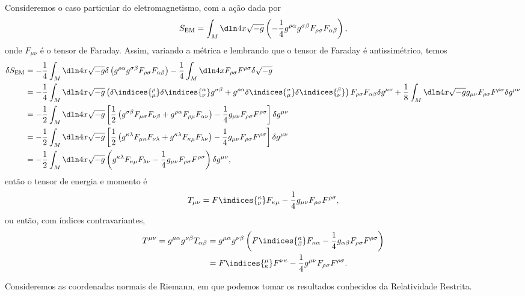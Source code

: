 Consideremos o caso particular do eletromagnetismo, com a ação dada por
\begin{equation*}
    S_\mathrm{EM} = \int_M\dln4x \sqrt{-g}\left(-\frac14 g^{\rho \alpha}g^{\sigma \beta}F_{\rho\sigma}F_{\alpha \beta}\right),
\end{equation*}
onde \(F_{\mu\nu}\) é o tensor de Faraday. Assim, variando a métrica e lembrando que o tensor de Faraday é antissimétrico, temos
\begin{align*}
    \delta S_\mathrm{EM} &= -\frac14\int_{M} \dln4x \sqrt{-g}\delta\left(g^{\rho \alpha}g^{\sigma \beta}F_{\rho\sigma}F_{\alpha\beta}\right) - \frac14 \int_{M} \dln4x F_{\rho\sigma}F^{\rho\sigma} \delta \sqrt{-g}\\
                         &= - \frac14 \int_{M} \dln4x \sqrt{-g} \left(\delta\indices{^\rho_\mu}\delta\indices{^\alpha_\nu} g^{\sigma\beta} + g^{\rho\alpha}\delta\indices{^\sigma_\mu}\delta\indices{^\beta_\nu}\right)F_{\rho\sigma}F_{\alpha\beta}\delta g^{\mu\nu} + \frac18\int_{M} \dln4x \sqrt{-g}g_{\mu\nu}F_{\rho\sigma}F^{\rho\sigma}\delta g^{\mu\nu}\\
                         &= - \frac12 \int_{M} \dln4x \sqrt{-g} \left[\frac12 \left(g^{\sigma\beta}F_{\mu\sigma}F_{\nu\beta} + g^{\rho\alpha}F_{\rho\mu}F_{\alpha\nu}\right) - \frac14 g_{\mu\nu}F_{\rho\sigma}F^{\rho\sigma}\right]\delta g^{\mu\nu}\\
                         &= - \frac12 \int_{M} \dln4x \sqrt{-g} \left[\frac12 \left( g^{\kappa\lambda}F_{\mu\kappa}F_{\nu\lambda} + g^{\kappa\lambda}F_{\kappa\mu}F_{\lambda\nu}\right) - \frac14 g_{\mu\nu}F_{\rho\sigma}F^{\rho\sigma}\right]\delta g^{\mu\nu}\\
                         &= - \frac12 \int_{M} \dln4x \sqrt{-g} \left(g^{\kappa\lambda}F_{\kappa\mu}F_{\lambda\nu} - \frac14 g_{\mu\nu}F_{\rho\sigma}F^{\rho\sigma}\right)\delta g^{\mu\nu},
\end{align*}
então o tensor de energia e momento é
\begin{equation*}
    T_{\mu\nu} = F\indices{^\kappa_\nu}F_{\kappa\mu} - \frac14 g_{\mu\nu} F_{\rho\sigma}F^{\rho\sigma},
\end{equation*}
ou então, com índices contravariantes,
\begin{align*}
    T^{\mu\nu} = g^{\mu\alpha}g^{\nu\beta}T_{\alpha\beta} &= g^{\mu\alpha}g^{\nu\beta} \left(F\indices{^\kappa_\beta}F_{\kappa\alpha} - \frac14 g_{\alpha\beta} F_{\rho\sigma}F^{\rho\sigma}\right)\\
                                                          &= F\indices{^\mu_\kappa}F^{\nu\kappa} - \frac14g^{\mu\nu}F_{\rho\sigma}F^{\rho\sigma}.
\end{align*}

Consideremos as coordenadas normais de Riemann, em que podemos tomar os resultados conhecidos da Relatividade Restrita.
